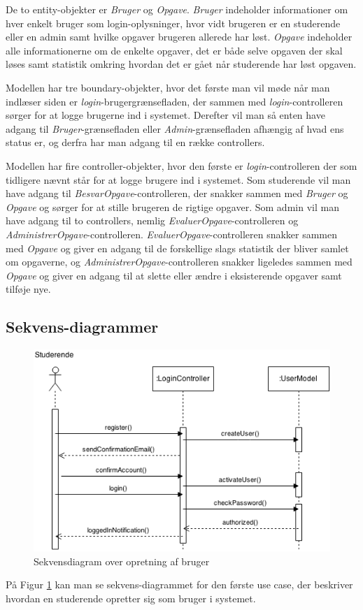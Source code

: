 \documentclass[12pt]{article}
\begin{document}
De to entity-objekter er \emph{Bruger} og \emph{Opgave}. \emph{Bruger} indeholder informationer om hver enkelt bruger som login-oplysninger, hvor vidt brugeren er en studerende eller en admin samt hvilke opgaver brugeren allerede har løst. \emph{Opgave} indeholder alle informationerne om de enkelte opgaver, det er både selve opgaven der skal løses samt statistik omkring hvordan det er gået når studerende har løst opgaven.

Modellen har tre boundary-objekter, hvor det første man vil møde når man indlæser siden er \textit{login}-brugergrænsefladen, der sammen med \emph{login}-controlleren sørger for at logge brugerne ind i systemet. Derefter vil man så enten have adgang til \emph{Bruger}-grænsefladen eller \emph{Admin}-grænsefladen afhængig af hvad ens status er, og derfra har man adgang til en række controllers.

Modellen har fire controller-objekter, hvor den første er \emph{login}-controlleren der som tidligere nævnt står for at logge brugere ind i systemet. Som studerende vil man have adgang til \emph{BesvarOpgave}-controlleren, der snakker sammen med \emph{Bruger} og \emph{Opgave} og sørger for at stille brugeren de rigtige opgaver. Som admin vil man have adgang til to controllers, nemlig \emph{EvaluerOpgave}-controlleren og \emph{AdministrerOpgave}-controlleren. \emph{EvaluerOpgave}-controlleren snakker sammen med \emph{Opgave} og giver en adgang til de forskellige slags statistik der bliver samlet om opgaverne, og \emph{AdministrerOpgave}-controlleren snakker ligeledes sammen med \emph{Opgave} og giver en adgang til at slette eller ændre i eksisterende opgaver samt tilføje nye.

\subsection{Sekvens-diagrammer}
\begin{figure}[htpb]
    \centering
    \includegraphics[width=0.7\linewidth]{figures/OpretBrugerUseCase.png}
    \caption{Sekvensdiagram over opretning af bruger}
    \label{fig:opret_bruger_sekvens}
\end{figure}
På Figur \ref{fig:opret_bruger_sekvens} kan man se sekvens-diagrammet for den første use case, der beskriver hvordan en studerende opretter sig som bruger i systemet.
\end{document}
